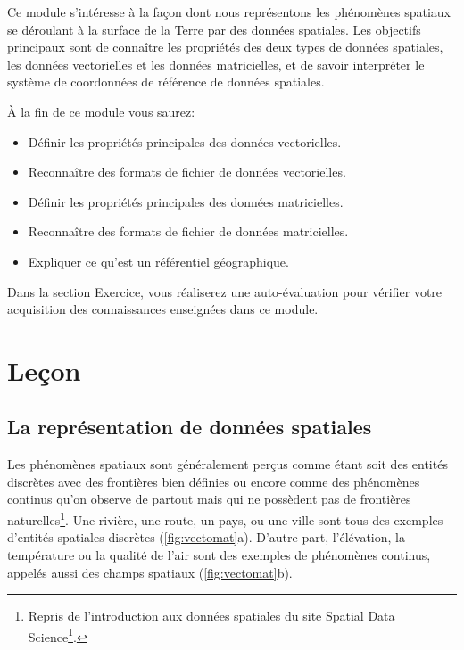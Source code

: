 \documentclass[
  12pt,
]{krantz}
\providecommand{\tightlist}{%
  \setlength{\itemsep}{0pt}\setlength{\parskip}{0pt}}
\renewcommand{\href}[2]{#2\footnote{\url{#1}}}
\begin{document}
Ce module s'intéresse à la façon dont nous représentons les phénomènes spatiaux se déroulant à la surface de la Terre par des données spatiales. Les objectifs principaux sont de connaître les propriétés des deux types de données spatiales, les données vectorielles et les données matricielles, et de savoir interpréter le système de coordonnées de référence de données spatiales.

À la fin de ce module vous saurez:

\begin{itemize}
\tightlist
\item
  Définir les propriétés principales des données vectorielles.
\item
  Reconnaître des formats de fichier de données vectorielles.
\item
  Définir les propriétés principales des données matricielles.
\item
  Reconnaître des formats de fichier de données matricielles.
\item
  Expliquer ce qu'est un référentiel géographique.
\end{itemize}

Dans la section Exercice, vous réaliserez une auto-évaluation pour vérifier votre acquisition des connaissances enseignées dans ce module.

\hypertarget{leuxe7on-1}{%
\section{Leçon}\label{leuxe7on-1}}

\hypertarget{la-repruxe9sentation-de-donnuxe9es-spatiales}{%
\subsection{La représentation de données spatiales}\label{la-repruxe9sentation-de-donnuxe9es-spatiales}}

Les phénomènes spatiaux sont généralement perçus comme étant soit des entités discrètes avec des frontières bien définies ou encore comme des phénomènes continus qu'on observe de partout mais qui ne possèdent pas de frontières naturelles\footnote{Repris de l'introduction aux données spatiales du site \href{https://rspatial.org/raster/spatial/2-spatialdata.html}{Spatial Data Science}.}. Une rivière, une route, un pays, ou une ville sont tous des exemples d'entités spatiales discrètes (\ref{fig:vectomat}a). D'autre part, l'élévation, la température ou la qualité de l'air sont des exemples de phénomènes continus, appelés aussi des champs spatiaux (\ref{fig:vectomat}b).
\end{document}

